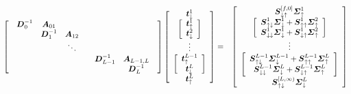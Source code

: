 \begin{samepage}
\begin{eqnarray} \label{Upsweep}
\left[{\begin{array}{cc}\begin{array}{ccc}{\bmi  D}^{-1}_{0}&{\bmi 
A}_{01}&\\ &{\bmi  D}^{-1}_{1}&{\bmi  A}_{12}\\&&\ddots\end{array}&\\
&\begin{array}{cc}{\bmi  D}^{-1}_{L-1}&{\bmi  A}_{ L-1,L}\\ &{\bmi  D}^{-1}_{L}
\end{array}\end{array}}\right]
\left[{\begin{array}{c}
{\bmi t}_{ \downarrow }^{1}\\
\left[{\begin{array}{c}
{\bmi t}_{ \uparrow }^{1}\\
{\bmi t}_{ \downarrow }^{2}\end{array}}\right]\\
\vdots\\
\left[{\begin{array}{c}
{\bmi t}_{ \uparrow }^{L-1}\\
{\bmi t}_{ \downarrow }^{L}\end{array}}\right]\\
{\bmi t}_{ \uparrow }^{L}\end{array}}\right]
&=&
\left[{\begin{array}{c}
{\bmi S}_{ \downarrow \uparrow }^{[f,0]}{ 
\bmi \Sigma}_{ \uparrow }^{1}\\ \left[{\begin{array}{c}{\bmi S}_{ \uparrow 
\downarrow }^{1}{ \bmi \Sigma}_{ \downarrow }^{1}+{\bmi S}_{ \uparrow \uparrow 
}^{1}{ \bmi \Sigma}_{ \uparrow }^{2}\\ {\bmi S}_{ \downarrow \downarrow 
}^{1}{ \bmi \Sigma}_{ \downarrow }^{1}+{\bmi S}_{ \downarrow \uparrow 
}^{1}{ \bmi \Sigma}_{ \uparrow }^{2}\end{array}}\right]\\ \vdots\\ 
\left[{\begin{array}{c}{\bmi S}_{ \uparrow \downarrow }^{L-1}{ \bmi \Sigma}_{ 
\downarrow }^{L-1}+{\bmi S}_{ \uparrow \uparrow }^{L-1}{ \bmi \Sigma}_{ 
\uparrow }^{L}\\ {\bmi S}_{ \downarrow \downarrow }^{L-1}{ \bmi \Sigma}_{ 
\downarrow }^{L}+{\bmi S}_{ \downarrow \uparrow }^{L-1}{ \bmi \Sigma}_{ 
\uparrow }^{L}\end{array}}\right]\\ {\bmi S}_{ \uparrow \downarrow }^{[L, 
\infty   )}{ \bmi \Sigma}_{ \downarrow }^{L}\end{array}}\right]\nonumber\\
&&
\end{eqnarray}
\end{samepage}
